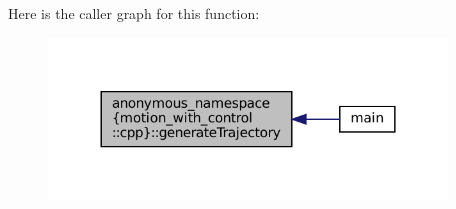 Here is the caller graph for this function\+:
\nopagebreak
\begin{figure}[H]
\begin{center}
\leavevmode
\includegraphics[width=300pt]{namespaceanonymous__namespace_02motion__with__control_8cpp_03_a96cf55e603f54e4305aaff129fc95d0a_icgraph}
\end{center}
\end{figure}
